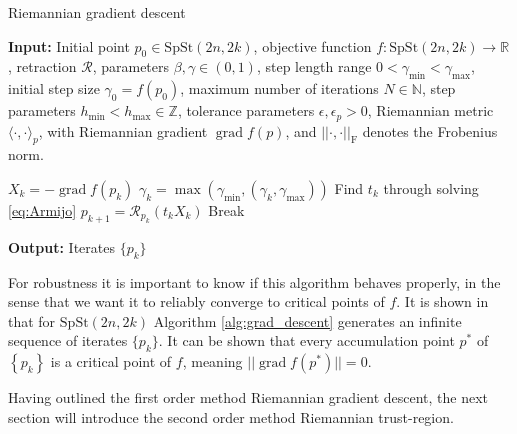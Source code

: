 \begin{algorithm}[H]
    \caption{Riemannian gradient descent}\label{alg:grad_descent}
    \textbf{Input:} Initial point $p_{0}\in \mathrm{SpSt}(2n, 2k)$, objective function $f\colon\mathrm{SpSt}(2n, 2k)\to \mathbb{R}$, retraction $\mathcal{R}$, parameters $\beta, \gamma \in(0,1)$, step length range $0<\gamma_{\text{min}}<\gamma_{\text{max}}$, initial step size $\gamma_{0}=f(p_{0})$, maximum number of iterations $N\in \mathbb{N}$, step parameters $h_{\text{min}}<h_{\text{max}}\in \mathbb{Z}$, tolerance parameters $\epsilon, \epsilon_{p}>0$, Riemannian metric $\langle \cdot,\cdot \rangle_{p}$, with Riemannian gradient $\operatorname{grad}f(p)$, and $\lvert \lvert \cdot,\cdot \rvert  \rvert_{\text{F}}$ denotes the Frobenius norm.
    \begin{algorithmic}[1]
        \State $X_{k}=-\operatorname{grad}f(p_{k})$
        \State $\gamma_{k}=\operatorname{max}(\gamma_{\text{min}},(\gamma_{k}, \gamma_{\text{max}}))$
        \State Find $t_{k}$ through solving \eqref{eq:Armijo}
        \State $p_{k+1}=\mathcal{R}_{p_{k}}(t_{k}X_{k})$
        \State Break
        \EndIf
        \EndFor
    \end{algorithmic}
    \textbf{Output:} Iterates $\{p_{k}\}$
\end{algorithm}

For robustness it is important to know if this algorithm behaves properly, in the sense that we want it to reliably converge to critical points of $f$. It is shown in \cite[Cor.~5.8]{GaoSonAbsilStykel2021} that for $\mathrm{SpSt}(2n, 2k)$ Algorithm \ref{alg:grad_descent} generates an infinite sequence of iterates $\{p_{k}\} $\cite[Prop.~5.6]{GaoSonAbsilStykel2021}. It can be shown that every accumulation point $p^*$ of $\left\{ p_{k} \right\}$ is a critical point of $f$, meaning $\lvert \lvert\operatorname{grad}f(p^{*})\rvert \rvert=0$. 

Having outlined the first order method Riemannian gradient descent, the next section will introduce the second order method Riemannian trust-region.
